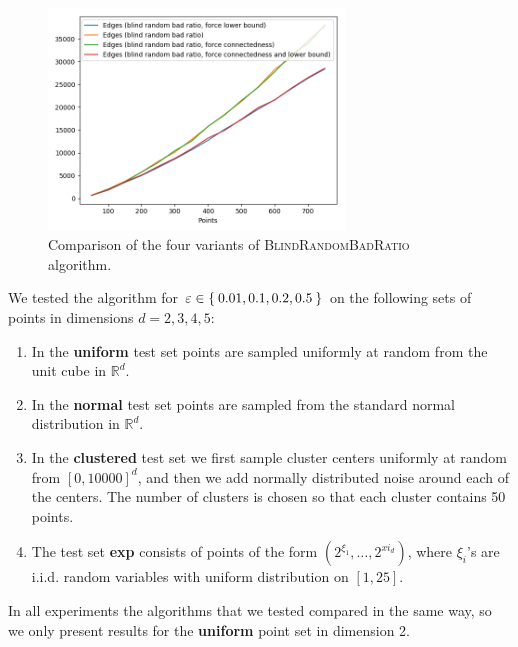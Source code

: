\documentclass[a4paper,USenglish]{socg-lipics-v2018}
\newcommand{\eps}{\varepsilon}
\begin{document}
\begin{figure}[ht]
    \label{fig:blind-rbr-variants}
    \includegraphics[width=0.7\textwidth]{pics/random-bad-ratio-comparison.png}
    \caption{Comparison of the four variants of \textsc{BlindRandomBadRatio} algorithm.}
\end{figure}

We tested the algorithm for $\eps \in \Set{0.01, 0.1, 0.2, 0.5}$ on the following sets of points in dimensions $d = 2,3,4,5$:
\begin{enumerate}
    \item In the \textbf{uniform} test set points are sampled uniformly at
        random from the unit cube in $\mathbb{R}^d$.
    \item In the \textbf{normal} test set points are sampled from the standard
        normal distribution in $\mathbb{R}^d$.
    \item In the \textbf{clustered} test set we first sample cluster centers uniformly 
        at random from $[0,10000]^d$, and then we add normally distributed noise around
        each of the centers. The number of clusters is chosen so that each cluster
        contains 50 points.
    \item The test set \textbf{exp} consists of points of the form $(2^{\xi_1}, \dots, 2^{xi_d})$,
        where $\xi_i$'s are i.i.d. random variables with uniform distribution on $[1,25]$.
\end{enumerate}
In all experiments the algorithms that we tested compared in the same way,
so we only present results for the \textbf{uniform} point set in dimension 2.
\end{document}

